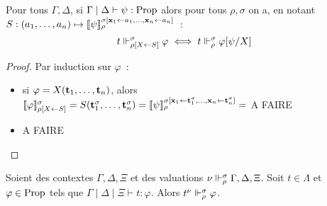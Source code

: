 \documentclass{article}
\begin{document}
\begin{lem}
  Pour tous $\Gamma,\Delta$, si $\Gamma\mid\Delta\vdash \psi : \mathrm{Prop}$ alors pour tous $\rho,\sigma$ on a, en notant $S : (a_1,\ldots,a_n) \mapsto \llbracket \psi \rrbracket_\rho^{\sigma[\mathbf{x}_1\leftarrow a_1,\ldots,\mathbf{x}_n\leftarrow a_n]}$~:
  \[t\Vdash_{\rho[X\leftarrow S]}^\sigma \varphi \iff t\Vdash_\rho^\sigma \varphi[\psi/X]\]
\end{lem}

\begin{proof}
  Par induction sur $\varphi$~:
  \begin{itemize}
  \item si $\varphi = X(\mathbf{t}_1,\ldots,\mathbf{t}_n)$, alors $\llbracket \varphi \rrbracket_{\rho[X\leftarrow S]}^\sigma = S(\mathbf{t}_1^\sigma,\ldots,\mathbf{t}_n^\sigma) = \llbracket \psi \rrbracket_\rho^{\sigma[\mathbf{x}_1\leftarrow \mathbf{t}_1^\sigma,\ldots,\mathbf{x}_n\leftarrow \mathbf{t}_n^\sigma]} = $ A FAIRE
  \item A FAIRE
  \end{itemize}
\end{proof}

\begin{lem}[Adéquation]
  Soient des contextes $\Gamma,\Delta,\Xi$ et des valuations $\nu\Vdash_\rho^\sigma \Gamma,\Delta,\Xi$. Soit $t\in\Lambda$ et $\varphi\in\mathrm{Prop}$ tels que $\Gamma\mid\Delta\mid\Xi\vdash t : \varphi$. Alors $t^\nu \Vdash_\rho^\sigma \varphi$.
\end{lem}
\end{document}
